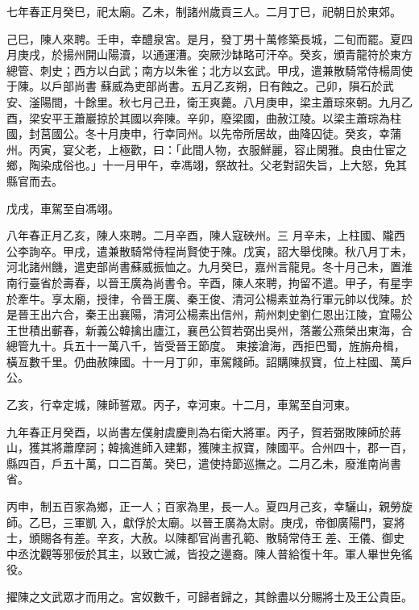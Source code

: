 \begin{pinyinscope}
 七年春正月癸巳，祀太廟。乙未，制諸州歲貢三人。二月丁巳，祀朝日於東郊。



 己巳，陳人來聘。壬申，幸醴泉宮。是月，發丁男十萬修築長城，二旬而罷。夏四月庚戌，於揚州開山陽瀆，以通運漕。突厥沙缽略可汗卒。癸亥，頒青龍符於東方總管、刺史；西方以白武；南方以朱雀；北方以玄武。甲戌，遣兼散騎常侍楊周使于陳。以戶部尚書
 蘇威為吏部尚書。五月乙亥朔，日有蝕之。己卯，隕石於武安、滏陽間，十餘里。秋七月己丑，衛王爽薨。八月庚申，梁主蕭琮來朝。九月乙酉，梁安平王蕭巖掠於其國以奔陳。辛卯，廢梁國，曲赦江陵。以梁主蕭琮為柱國，封莒國公。冬十月庚申，行幸同州。以先帝所居故，曲降囚徒。癸亥，幸蒲州。丙寅，宴父老，上極歡，曰：「此間人物，衣服鮮麗，容止閑雅。良由仕宦之鄉，陶染成俗也。」十一月甲午，幸馮翊，祭故社。父老對詔失旨，上大怒，免其縣官而去。



 戊戌，車駕至自馮翊。



 八年春正月乙亥，陳人來聘。二月辛酉，陳人寇硤州。三
 月辛未，上柱國、隴西公李詢卒。甲戌，遣兼散騎常侍程尚賢使于陳。戊寅，詔大舉伐陳。秋八月丁未，河北諸州饑，遣吏部尚書蘇威振恤之。九月癸巳，嘉州言龍見。冬十月己未，置淮南行臺省於壽春，以晉王廣為尚書令。辛酉，陳人來聘，拘留不遣。甲子，有星孛於牽牛。享太廟，授律，令晉王廣、秦王俊、清河公楊素並為行軍元帥以伐陳。於是晉王出六合，秦王出襄陽，清河公楊素出信州，荊州刺史劉仁恩出江陵，宜陽公王世積出蘄春，新義公韓擒出廬江，襄邑公賀若弼出吳州，落叢公燕榮出東海，合總管九十。兵五十一萬八千，皆受晉王節度。
 東接滄海，西拒巴蜀，旌旃舟楫，橫亙數千里。仍曲赦陳國。十一月丁卯，車駕餞師。詔購陳叔寶，位上柱國、萬戶公。



 乙亥，行幸定城，陳師誓眾。丙子，幸河東。十二月，車駕至自河東。



 九年春正月癸酉，以尚書左僕射虞慶則為右衛大將軍。丙子，賀若弼敗陳師於蔣山，獲其將蕭摩訶；韓擒進師入建鄴，獲陳主叔寶，陳國平。合州四十，郡一百，縣四百，戶五十萬，口二百萬。癸巳，遣使持節巡撫之。二月乙未，廢淮南尚書省。



 丙申，制五百家為鄉，正一人；百家為里，長一人。夏四月己亥，幸驪山，親勞旋師。乙巳，三軍凱
 入，獻俘於太廟。以晉王廣為太尉。庚戌，帝御廣陽門，宴將士，頒賜各有差。辛亥，大赦。以陳都官尚書孔範、散騎常侍王差、王儀、御史中丞沈觀等邪佞於其主，以致亡滅，皆投之邊裔。陳人普給復十年。軍人畢世免徭役。



 擢陳之文武眾才而用之。宮奴數千，可歸者歸之，其餘盡以分賜將士及王公貴臣。




\end{pinyinscope}
